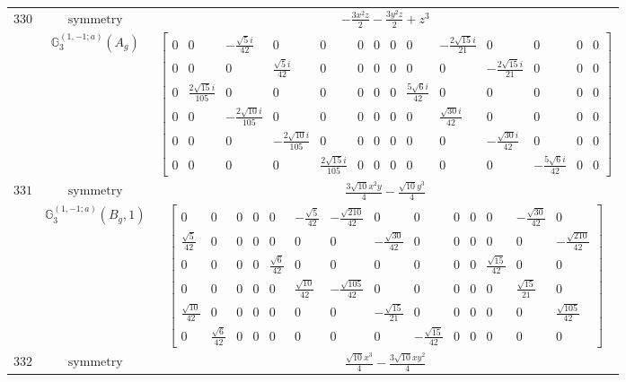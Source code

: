 \documentclass[fleqn,8pt,landscape]{jsarticle}
\begin{document}
\begin{longtable}{ccc}
$ 330 $ & $ \text{symmetry} $ & $ - \frac{3 x^{2} z}{2} - \frac{3 y^{2} z}{2} + z^{3} $ \\
$  $ & $ \mathbb{G}_{3}^{(1,-1;a)}(A_{g}) $ & $ \begin{bmatrix} 0 & 0 & - \frac{\sqrt{5} i}{42} & 0 & 0 & 0 & 0 & 0 & 0 & - \frac{2 \sqrt{15} i}{21} & 0 & 0 & 0 & 0 \\ 0 & 0 & 0 & \frac{\sqrt{5} i}{42} & 0 & 0 & 0 & 0 & 0 & 0 & - \frac{2 \sqrt{15} i}{21} & 0 & 0 & 0 \\ 0 & \frac{2 \sqrt{15} i}{105} & 0 & 0 & 0 & 0 & 0 & 0 & \frac{5 \sqrt{6} i}{42} & 0 & 0 & 0 & 0 & 0 \\ 0 & 0 & - \frac{2 \sqrt{10} i}{105} & 0 & 0 & 0 & 0 & 0 & 0 & \frac{\sqrt{30} i}{42} & 0 & 0 & 0 & 0 \\ 0 & 0 & 0 & - \frac{2 \sqrt{10} i}{105} & 0 & 0 & 0 & 0 & 0 & 0 & - \frac{\sqrt{30} i}{42} & 0 & 0 & 0 \\ 0 & 0 & 0 & 0 & \frac{2 \sqrt{15} i}{105} & 0 & 0 & 0 & 0 & 0 & 0 & - \frac{5 \sqrt{6} i}{42} & 0 & 0 \end{bmatrix} $ \\ \hline
$ 331 $ & $ \text{symmetry} $ & $ \frac{3 \sqrt{10} x^{2} y}{4} - \frac{\sqrt{10} y^{3}}{4} $ \\
$  $ & $ \mathbb{G}_{3}^{(1,-1;a)}(B_{g},1) $ & $ \begin{bmatrix} 0 & 0 & 0 & 0 & 0 & - \frac{\sqrt{5}}{42} & - \frac{\sqrt{210}}{42} & 0 & 0 & 0 & 0 & 0 & - \frac{\sqrt{30}}{42} & 0 \\ \frac{\sqrt{5}}{42} & 0 & 0 & 0 & 0 & 0 & 0 & - \frac{\sqrt{30}}{42} & 0 & 0 & 0 & 0 & 0 & - \frac{\sqrt{210}}{42} \\ 0 & 0 & 0 & 0 & \frac{\sqrt{6}}{42} & 0 & 0 & 0 & 0 & 0 & 0 & \frac{\sqrt{15}}{42} & 0 & 0 \\ 0 & 0 & 0 & 0 & 0 & \frac{\sqrt{10}}{42} & - \frac{\sqrt{105}}{42} & 0 & 0 & 0 & 0 & 0 & \frac{\sqrt{15}}{21} & 0 \\ \frac{\sqrt{10}}{42} & 0 & 0 & 0 & 0 & 0 & 0 & - \frac{\sqrt{15}}{21} & 0 & 0 & 0 & 0 & 0 & \frac{\sqrt{105}}{42} \\ 0 & \frac{\sqrt{6}}{42} & 0 & 0 & 0 & 0 & 0 & 0 & - \frac{\sqrt{15}}{42} & 0 & 0 & 0 & 0 & 0 \end{bmatrix} $ \\ \hline
$ 332 $ & $ \text{symmetry} $ & $ \frac{\sqrt{10} x^{3}}{4} - \frac{3 \sqrt{10} x y^{2}}{4} $ \\

\end{longtable}
\end{document}
